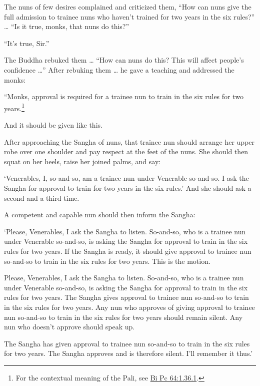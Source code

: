 \documentclass[12pt,openany]{book}%
\begin{document}
The nuns of few desires complained and criticized them, “How can nuns give the full admission to trainee nuns who haven’t trained for two years in the six rules?” … “Is it true, monks, that nuns do this?” 

“It’s true, Sir.” 

The Buddha rebuked them … “How can nuns do this? This will affect people’s confidence …” After rebuking them … he gave a teaching and addressed the monks: 

“Monks, approval is required for a trainee nun to train in the six rules for two years.\footnote{For the contextual meaning of the Pali, see \href{https://suttacentral.net/pli-tv-bi-vb-pc64/en/brahmali\#1.36.1}{Bi Pc 64:1.36.1}. } 

And it should be given like this. 

After approaching the Sangha of nuns, that trainee nun should arrange her upper robe over one shoulder and pay respect at the feet of the nuns. She should then squat on her heels, raise her joined palms, and say: 

‘Venerables, I, so-and-so, am a trainee nun under Venerable so-and-so. I ask the Sangha for approval to train for two years in the six rules.’ And she should ask a second and a third time. 

A competent and capable nun should then inform the Sangha: 

‘Please, Venerables, I ask the Sangha to listen. So-and-so, who is a trainee nun under Venerable so-and-so, is asking the Sangha for approval to train in the six rules for two years. If the Sangha is ready, it should give approval to trainee nun so-and-so to train in the six rules for two years. This is the motion. 

Please, Venerables, I ask the Sangha to listen. So-and-so, who is a trainee nun under Venerable so-and-so, is asking the Sangha for approval to train in the six rules for two years. The Sangha gives approval to trainee nun so-and-so to train in the six rules for two years. Any nun who approves of giving approval to trainee nun so-and-so to train in the six rules for two years should remain silent. Any nun who doesn’t approve should speak up. 

The Sangha has given approval to trainee nun so-and-so to train in the six rules for two years. The Sangha approves and is therefore silent. I’ll remember it thus.’ 
\end{document}
